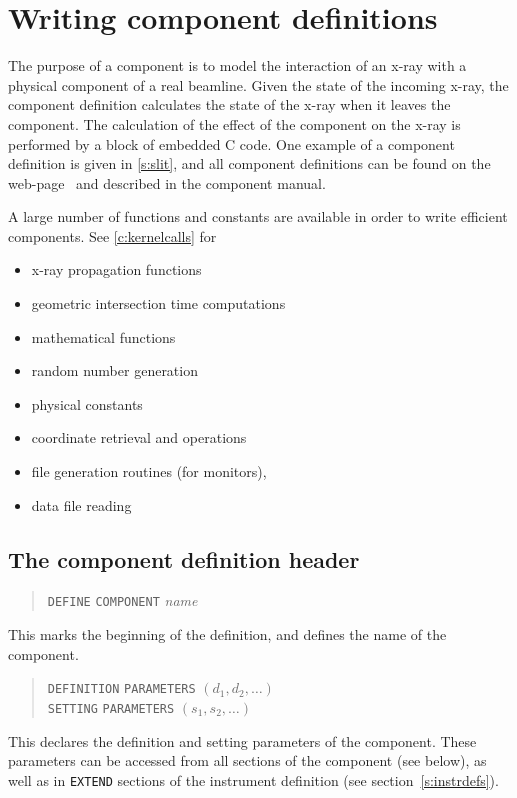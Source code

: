 
\section{Writing component definitions}
\label{s:compdefs}

The purpose of a \MCX component is to model the interaction of an
x-ray with a physical component of a real beamline. Given the
state of the incoming x-ray, the
component definition calculates the state of the x-ray when it leaves
the component.  The calculation of the effect of the component on the
x-ray is performed by a block of embedded C code.
One example of a component definition is given in \cref{s:slit}, and all
component definitions can be found on the \MCX
web-page~\cite{mcxtrace_webpage} and described in the \MCX component manual.

A large number of functions and constants are available in
order to write efficient components. See \cref{c:kernelcalls}
for
\begin{itemize}
\item x-ray propagation functions
\item geometric intersection time computations
\item mathematical functions
\item random number generation
\item physical constants
\item coordinate retrieval and operations
\item file generation routines (for monitors),
\item data file reading
\end{itemize}



\subsection{The component definition header}
\label{s:comp-header}

\begin{quote}
  \texttt{DEFINE} \texttt{COMPONENT} \textit{name}
\end{quote}
This marks the beginning of the definition, and defines the name of the
component.
\begin{quote}
  \texttt{DEFINITION} \texttt{PARAMETERS} $(d_1, d_2, \ldots)$ \\
  \texttt{SETTING} \texttt{PARAMETERS} $(s_1, s_2, \ldots)$
\end{quote}
This declares the definition and setting parameters of the component.
These parameters can be
accessed from all sections of the component (see below),
as well as in \verb+EXTEND+ sections of the instrument definition (see section~\ref{s:instrdefs}).

